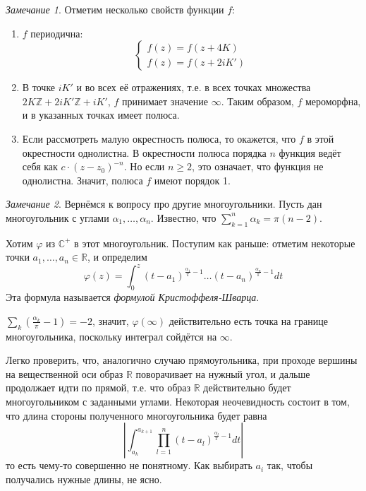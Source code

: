 \documentclass[12pt]{article}
\newcommand{\Z}{\mathbb{Z}}
\newcommand{\R}{\mathbb{R}}
\renewcommand{\C}{\mathbb{C}}
\theoremstyle{thmnote}
\theoremstyle{remark}
\newtheorem*{remark}{Замечание}
\theoremstyle{defnote}
\begin{document}
\begin{remark}
    Отметим несколько свойств функции $f$:
    \begin{enumerate}
        \item $f$ периодична:
            \begin{equation*}
                \begin{cases}
                    f(z) = f(z + 4K) \\
                    f(z) = f(z + 2iK')
                \end{cases}
            \end{equation*}
        \item В точке $iK'$ и во всех её отражениях, т.е. в всех точках множества $2K\Z + 2iK'\Z + iK'$, $f$ принимает значение $\infty$. Таким образом, $f$ мероморфна, и в указанных точках имеет полюса.
        \item Если рассмотреть малую окрестность полюса, то окажется, что $f$ в этой окрестности однолистна. В окрестности полюса порядка $n$ функция ведёт себя как $c \cdot (z - z_0)^{-n}$. Но если $n \geq 2$, это означает, что функция не однолистна. Значит, полюса $f$ имеют порядок 1.
    \end{enumerate}
\end{remark}

\begin{remark}
    Вернёмся к вопросу про другие многоугольники. Пусть дан многоугольник с углами $\alpha_1, \hdots, \alpha_n$. Известно, что $\sum_{k = 1}^n \alpha_k = \pi(n - 2)$.

    Хотим $\varphi$ из $\C^+$ в этот многоугольник. Поступим как раньше: отметим некоторые точки $a_1, \hdots, a_n \in \R$, и определим
    \begin{equation*}
        \varphi(z) = \int_0^z (t - a_1)^{\frac{\alpha_1}{\pi} - 1} \hdots (t - a_n)^{\frac{\alpha_n}{\pi} - 1} dt
    \end{equation*}
    Эта формула называется \textit{формулой Кристоффеля-Шварца}.

    $\sum_k \left(\frac{\alpha_k}{\pi} - 1\right) = -2$, значит, $\varphi(\infty)$ действительно есть точка на границе многоугольника, поскольку интеграл сойдётся на $\infty$.

    Легко проверить, что, аналогично случаю прямоугольника, при проходе вершины на вещественной оси образ $\R$ поворачивает на нужный угол, и дальше продолжает идти по прямой, т.е. что образ $\R$ действительно будет многоугольником с заданными углами. Некоторая неочевидность состоит в том, что длина стороны полученного многоугольника будет равна
    \begin{equation*}
        \left| \int_{a_k}^{a_{k+1}} \prod_{l = 1}^{n} (t - a_l)^{\frac{\alpha_l}{\pi} - 1} dt \right|
    \end{equation*}
    то есть чему-то совершенно не понятному. Как выбирать $a_i$ так, чтобы получались нужные длины, не ясно.
\end{remark}
\end{document}
